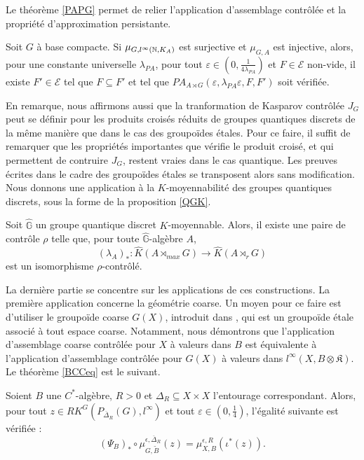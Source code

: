 Le théorème \ref{PAPG} permet de relier l'application d'assemblage contrôlée et la propriété d'approximation persistante. 

\begin{thm} 
Soit $G$ à base compacte. Si $\mu_{G,l^\infty(\mathbb N, K_A)}$ est surjective et $\mu_{G,A}$ est injective, alors, pour une constante universelle $\lambda_{PA}$, pour tout $\varepsilon \in(0,\frac{1}{4\lambda_{PA}})$ et $F\in\mathcal E$ non-vide, il existe $F'\in\mathcal E$ tel que $F\subseteq F'$ et tel que $PA_{A\rtimes G}(\varepsilon,\lambda_{PA}\varepsilon,F,F')$ soit vérifiée.
\end{thm}

En remarque, nous affirmons aussi que la tranformation de Kasparov contrôlée $J_G$ peut se définir pour les produits croisés réduits de groupes quantiques discrets de la même manière que dans le cas des groupoïdes étales. Pour ce faire, il suffit de remarquer que les propriétés importantes que vérifie le produit croisé, et qui permettent de contruire $J_G$, restent vraies dans le cas quantique. Les preuves écrites dans le cadre des groupoïdes étales se transposent alors sans modification.\\

Nous donnons une application à la $K$-moyennabilité des groupes quantiques discrets, sous la forme de la proposition \ref{QGK}.

\begin{prop}
Soit $\hat{\mathbb G}$ un groupe quantique discret $K$-moyennable. Alors, il existe une paire de contrôle $\rho$ telle que, pour toute $\hat{\mathbb G}$-algèbre $A$,
\[(\lambda_A)_* : \hat K(A\rtimes_{max} G) \rightarrow \hat K(A\rtimes_r G) \]
est un isomorphisme $\rho$-contrôlé.
\end{prop}

La dernière partie se concentre sur les applications de ces constructions. La première application concerne la géométrie coarse. Un moyen pour ce faire est d'utiliser le groupoïde coarse $G(X)$, introduit dans \cite{SkTuYu}, qui est un groupoïde étale associé à tout espace coarse. Notamment, nous démontrons que l'application d'assemblage coarse contrôlée pour $X$ à valeurs dans $B$ est équivalente à l'application d'assemblage contrôlée pour $G(X)$ à valeurs dans $l^\infty(X,B\otimes\mathfrak K)$. Le théorème \ref{BCCeq} est le suivant.

\begin{thm}
Soient $B$ une $C^*$-algèbre, $R>0$ et $\Delta_R\subseteq X\times X$ l'entourage correspondant. Alors, pour tout $z\in RK^G(P_{\overline \Delta_R}(G),l^\infty)$ et tout $\varepsilon\in(0,\frac{1}{4})$, l'égalité suivante est vérifiée :
\[(\Psi_B)_*\circ\mu^{\epsilon,\overline\Delta_R}_{G,\tilde B} (z) = \mu_{X,B}^{\epsilon,R}(\iota^*(z)).\]
\end{thm}

